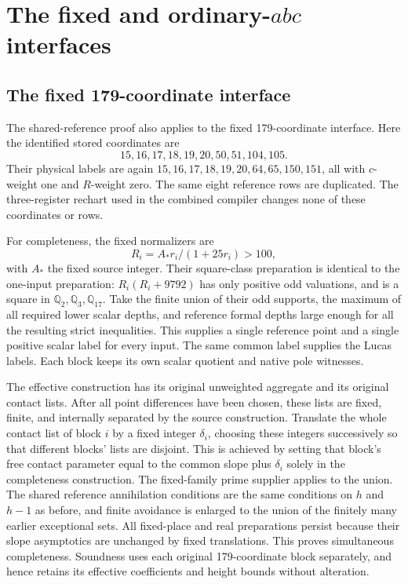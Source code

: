 \documentclass[11pt]{article}
\newcommand{\Q}{\mathbb Q}\newcommand{\Z}{\mathbb Z}
\begin{document}
\section{The fixed and ordinary-\(abc\) interfaces}

\subsection{The fixed 179-coordinate interface}
The shared-reference proof also applies to the fixed 179-coordinate
interface. Here the identified stored coordinates are
\[
                15,16,17,18,19,20,50,51,104,105.
\]
Their physical labels are again \(15,16,17,18,19,20,64,65,150,151\),
all with \(c\)-weight one and \(R\)-weight zero. The same eight reference
rows are duplicated. The three-register rechart used in the combined
compiler changes none of these coordinates or rows.

For completeness, the fixed normalizers are
\[
 R_i=A_*r_i/(1+25r_i)>100,
\]
with \(A_*\) the fixed source integer. Their square-class preparation is
identical to the one-input preparation: \(R_i(R_i+9792)\) has only positive
odd valuations, and is a square in \(\Q_2,\Q_3,\Q_{17}\). Take the finite
union of their odd supports, the maximum of all required lower scalar
depths, and reference formal depths large enough for all the resulting
strict inequalities. This supplies a single reference point and a single
positive scalar label for every input. The same common label supplies the
Lucas labels. Each block keeps its own scalar quotient and native pole
witnesses.

The effective construction has its original unweighted aggregate and its
original contact lists. After all point differences have been chosen,
these lists are fixed, finite, and internally separated by the source
construction. Translate the whole contact list of block \(i\) by a fixed
integer \(\delta_i\), choosing these integers successively so that different
blocks' lists are disjoint. This is achieved by setting that block's free
contact parameter equal to the common slope plus \(\delta_i\) solely in
the completeness construction. The fixed-family prime supplier applies
to the union. The shared reference annihilation conditions are the same
conditions on \(h\) and \(h-1\) as before, and finite avoidance is enlarged
to the union of the finitely many earlier exceptional sets. All fixed-place
and real preparations persist because their slope asymptotics are unchanged
by fixed translations. This proves simultaneous completeness. Soundness
uses each original 179-coordinate block separately, and hence retains its
effective coefficients and height bounds without alteration.
\end{document}
